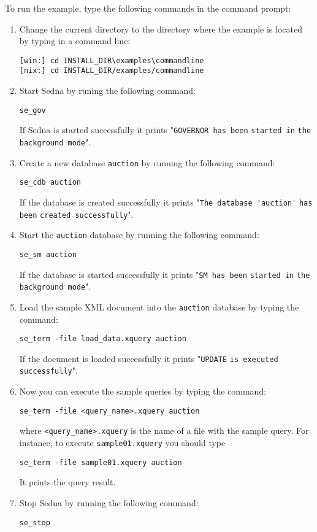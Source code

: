 \documentclass[a4paper,12pt]{article}
\begin{document}
To run the example, type the following commands in the command prompt:
\begin{enumerate}
\item Change the current directory to the directory where the example is located by typing in a command line:
\begin{verbatim}
[win:] cd INSTALL_DIR\examples\commandline
[nix:] cd INSTALL_DIR/examples/commandline
\end{verbatim}
\item Start Sedna by runing the following command: 
\begin{verbatim}
se_gov 
\end{verbatim}
If Sedna is started successfully it prints "\verb!GOVERNOR has been! \verb!started in! \verb!the background mode!".
\item Create a new database \verb!auction! by running the following command: 
\begin{verbatim}
se_cdb auction
\end{verbatim}
If the database is created successfully it prints "\verb!The database 'auction'! \verb!has been! \verb!created successfully!". 
\item Start the \verb!auction! database by running the following command:
\begin{verbatim}
se_sm auction
\end{verbatim}
If the database is started successfully it prints "\verb!SM has been! \verb!started in! \verb!the background mode!".
\item Load the sample XML document into the \verb!auction! database by typing the command:
\begin{verbatim}
se_term -file load_data.xquery auction
\end{verbatim}
If the document is loaded successfully it prints "\verb!UPDATE! \verb!is executed! \verb!successfully!".
\item Now you can execute the sample queries by typing the command:
\begin{verbatim}
se_term -file <query_name>.xquery auction
\end{verbatim}
where \verb!<query_name>.xquery! is the name of a file with the sample query.
For instance, to execute \verb!sample01.xquery! you should type 
\begin{verbatim}
se_term -file sample01.xquery auction
\end{verbatim}
It prints the query result.
\item Stop Sedna by running the following command:
\begin{verbatim}
se_stop
\end{verbatim}
\end{enumerate}
\end{document}
